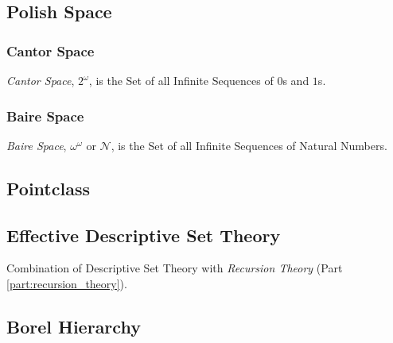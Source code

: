 \subsection{Polish Space}\label{sec:polish_space}

\subsubsection{Cantor Space}\label{sec:cantor_space}

\emph{Cantor Space}, $2^{\omega}$, is the Set of all Infinite
Sequences of $0$s and $1$s.



\subsubsection{Baire Space}\label{sec:baire_space}

\emph{Baire Space}, $\omega^{\omega}$ or $\mathcal{N}$, is the Set of
all Infinite Sequences of Natural Numbers.



\subsection{Pointclass}\label{sec:pointclass}

\subsection{Effective Descriptive Set Theory}
\label{sec:effective_descriptive}

Combination of Descriptive Set Theory with \emph{Recursion Theory}
(Part \ref{part:recursion_theory}).

\subsection{Borel Hierarchy}\label{sec:borel_hierarchy}



